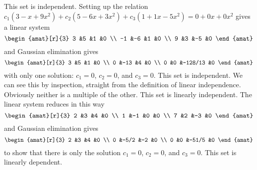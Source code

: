 \begin{Answer}
\Question This set is independent.
          Setting up the relation
          \( c_1(3-x+9x^2)+c_2(5-6x+3x^2)+c_3(1+1x-5x^2)=0+0x+0x^2 \)
          gives a linear system 
          \begin{equation*}
            \begin{amat}[r]{3}
              3  &5  &1  &0  \\
              -1 &-6 &1  &0  \\
              9  &3  &-5 &0  
            \end{amat}
        \end{equation*}
and Gaussian elimination gives
\begin{equation*}    
	\begin{amat}[r]{3}
              3  &5   &1        &0  \\
              0  &-13 &4        &0  \\
              0  &0   &-128/13  &0  
            \end{amat}
          \end{equation*}
          with only one solution: \( c_1=0 \), \( c_2=0 \), and \( c_3=0 \).
        \Question This set is independent.
           We can see this by inspection, straight from the definition
           of linear independence.
           Obviously neither is a multiple of the other.
        \Question This set is linearly independent.
           The linear system reduces in this way
           \begin{equation*}
             \begin{amat}[r]{3}
               2  &3  &4  &0  \\
               1  &-1 &0  &0  \\
               7  &2  &-3 &0  
             \end{amat}
        \end{equation*}
and Gaussian elimination gives
\begin{equation*}                
\begin{amat}[r]{3}
               2  &3    &4      &0  \\
               0  &-5/2 &-2     &0  \\
               0  &0    &-51/5  &0  
             \end{amat}
           \end{equation*}
           to show that there is only the solution $c_1=0$, 
           $c_2=0$, and $c_3=0$.
        \Question This set is linearly dependent.

\end{Answer}
